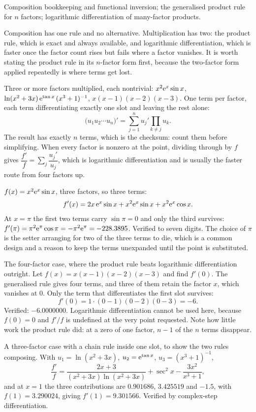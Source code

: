 \begin{seealsob}Composition bookkeeping and functional inversion; the generalised product rule for $n$ factors; logarithmic differentiation of many-factor products.\end{seealsob}

Composition has one rule and no alternative. Multiplication has two: the product rule, which is exact and always available, and logarithmic differentiation, which is faster once the factor count rises but fails where a factor vanishes. It is worth stating the product rule in its $n$-factor form first, because the two-factor form applied repeatedly is where terms get lost.

\cue Three or more factors multiplied, each nontrivial: $x^{2}\mathrm{e}^{x}\sin x$, $\ln(x^{2}+3x)\,\mathrm{e}^{\tan x}\,(x^{3}+1)^{-1}$, $x(x-1)(x-2)(x-3)$.
\method One term per factor, each term differentiating exactly one slot and leaving the rest alone:
\[
\bigl(u_{1}u_{2}\cdots u_{n}\bigr)'=\sum_{j=1}^{n}u_{j}'\prod_{k\neq j}u_{k}.
\]
The result has exactly $n$ terms, which is the checksum: count them before simplifying. When every factor is nonzero at the point, dividing through by $f$ gives $\dfrac{f'}{f}=\sum_{j}\dfrac{u_{j}'}{u_{j}}$, which is logarithmic differentiation and is usually the faster route from four factors up.

\begin{worked}
$f(x)=x^{2}\mathrm{e}^{x}\sin x$, three factors, so three terms:
\[
f'(x)=2x\,\mathrm{e}^{x}\sin x+x^{2}\mathrm{e}^{x}\sin x+x^{2}\mathrm{e}^{x}\cos x .
\]
At $x=\pi$ the first two terms carry $\sin\pi=0$ and only the third survives: $f'(\pi)=\pi^{2}\mathrm{e}^{\pi}\cos\pi=-\pi^{2}\mathrm{e}^{\pi}=-228.3895$. Verified to seven digits. The choice of $\pi$ is the setter arranging for two of the three terms to die, which is a common design and a reason to keep the terms unexpanded until the point is substituted.

The four-factor case, where the product rule beats logarithmic differentiation outright. Let $f(x)=x(x-1)(x-2)(x-3)$ and find $f'(0)$. The generalised rule gives four terms, and three of them retain the factor $x$, which vanishes at $0$. Only the term that differentiates the first slot survives:
\[
f'(0)=1\cdot(0-1)(0-2)(0-3)=-6 .
\]
Verified: $-6.0000000$. Logarithmic differentiation cannot be used here, because $f(0)=0$ and $f'/f$ is undefined at the very point requested. Note how little work the product rule did: at a zero of one factor, $n-1$ of the $n$ terms disappear.

A three-factor case with a chain rule inside one slot, to show the two rules composing. With $u_{1}=\ln(x^{2}+3x)$, $u_{2}=\mathrm{e}^{\tan x}$, $u_{3}=(x^{3}+1)^{-1}$,
\[
\frac{f'}{f}=\frac{2x+3}{(x^{2}+3x)\ln(x^{2}+3x)}+\sec^{2}x-\frac{3x^{2}}{x^{3}+1},
\]
and at $x=1$ the three contributions are $0.901686$, $3.425519$ and $-1.5$, with $f(1)=3.290024$, giving $f'(1)=9.301566$. Verified by complex-step differentiation.
\end{worked}


